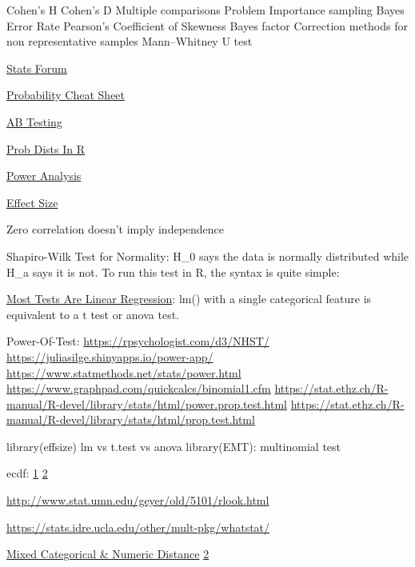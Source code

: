 \documentclass[]{book}
\begin{document}
Cohen's H \textbar{} Cohen's D \textbar{} Multiple comparisons Problem
\textbar{} Importance sampling \textbar{} Bayes Error Rate \textbar{}
Pearson's Coefficient of Skewness \textbar{} Bayes factor \textbar{}
Correction methods for non representative samples \textbar{}
Mann--Whitney U test

\href{https://discourse.datamethods.org/}{Stats Forum}

\href{http://www.wzchen.com/probability-cheatsheet}{Probability Cheat
Sheet}

\href{http://www.evanmiller.org/announcing-evans-awesome-ab-tools.html}{AB
Testing}

\href{http://www.cyclismo.org/tutorial/R/probability.html}{Prob Dists In
R}

\href{https://www.statmethods.net/stats/power.html}{Power Analysis}

\href{https://www.leeds.ac.uk/educol/documents/00002182.htm}{Effect
Size}

Zero correlation doesn't imply independence

Shapiro-Wilk Test for Normality: H\_0 says the data is normally
distributed while H\_a says it is not. To run this test in R, the syntax
is quite simple:

\href{https://lindeloev.github.io/tests-as-linear/}{Most Tests Are
Linear Regression}: lm() with a single categorical feature is equivalent
to a t test or anova test.

Power-Of-Test: \url{https://rpsychologist.com/d3/NHST/}
\url{https://juliasilge.shinyapps.io/power-app/}
\url{https://www.statmethods.net/stats/power.html}
\url{https://www.graphpad.com/quickcalcs/binomial1.cfm}
\url{https://stat.ethz.ch/R-manual/R-devel/library/stats/html/power.prop.test.html}
\url{https://stat.ethz.ch/R-manual/R-devel/library/stats/html/prop.test.html}

library(effsize) lm vs t.test vs anova library(EMT): multinomial test

ecdf: \href{http://www.ericmjl.com/blog/2018/7/14/ecdfs/}{1} \textbar{}
\href{https://www.rdocumentation.org/packages/stats/versions/3.4.3/topics/ecdf}{2}

\url{http://www.stat.umn.edu/geyer/old/5101/rlook.html}

\url{https://stats.idre.ucla.edu/other/mult-pkg/whatstat/}

\href{https://www.rdocumentation.org/packages/StatMatch/versions/1.2.5/topics/gower.dist}{Mixed
Categorical \& Numeric Distance} \textbar{}
\href{https://www.rdocumentation.org/packages/ltm/versions/1.1-1/topics/biserial.cor}{2}
\end{document}
